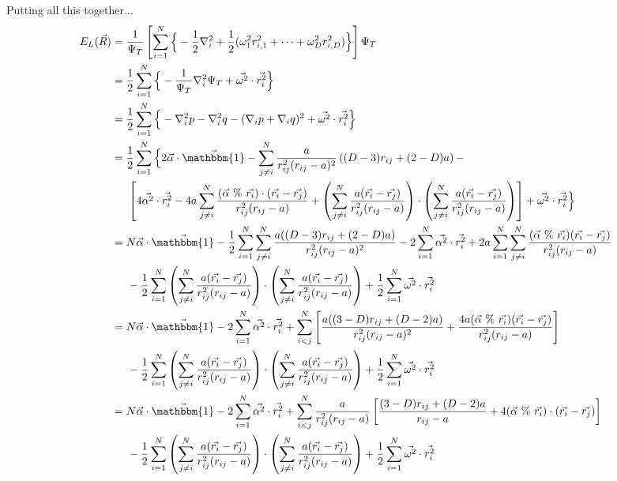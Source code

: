 \documentclass[12pt]{article}
\begin{document}
Putting all this together...
\begin{align*}
E_L(\vec{R}) &= \frac{1}{\Psi_T} 
\left[ \sum_{i=1}^N \Big\{ -\frac{1}{2}\nabla_i^2 + \frac{1}{2}(\omega_1^2r_{i,1}^2+\cdots+\omega_{D}^2r_{i,D}^2) \Big\} \right] \Psi_T \\
&= \frac{1}{2}  \sum_{i=1}^N \Big\{ -\frac{1}{\Psi_T} \nabla_i^2 \Psi_T + \vec{\omega^2} \cdot \vec{r_i^2}   \Big\}\\
&= \frac{1}{2} \sum_{i=1}^N \Big \{ - \nabla_i^2 p - \nabla_i^2 q - (\nabla_i p + \nabla_i q)^2 + \vec{\omega^2} \cdot \vec{r_i^2}   \Big\}\\
&= \frac{1}{2} \sum_{i=1}^N \Big \{ 2\vec{\alpha}\cdot \vec{\mathbbm{1}} - \sum_{j\neq i}^N \frac{a}{r_{ij}^2(r_{ij}-a)^2} \left( (D-3)r_{ij}+(2-D)a   \right) - \\
& \hspace*{5mm} \left[ 4 \vec{\alpha^2}\cdot\vec{r_i^2} - 4a \sum_{j\neq i}^N \frac{(\vec{\alpha} \ \% \ \vec{r_i}) \cdot (\vec{r_i}-\vec{r_j})}{r_{ij}^2(r_{ij}-a)} + \left( \sum_{j\neq i}^N \frac{a(\vec{r_i}-\vec{r_j})}{r_{ij}^2(r_{ij}-a)} \right) \cdot \left( \sum_{j\neq i}^N \frac{a(\vec{r_i}-\vec{r_j})}{r_{ij}^2(r_{ij}-a)} \right) \right] + \vec{\omega^2} \cdot \vec{r_i^2}   \Big\}\\
& = N\vec{\alpha}\cdot\vec{\mathbbm{1}} - \frac{1}{2}\sum_{i=1}^N \sum_{j\neq i}^N \frac{a((D-3)r_{ij}+(2-D)a)}{r_{ij}^2(r_{ij}-a)^2} - 2\sum_{i=1}^N \vec{\alpha^2}\cdot \vec{r_i^2} + 2a \sum_{i=1}^N \sum_{j \neq i}^N \frac{(\vec{\alpha} \ \% \ \vec{r_i})(\vec{r_i}-\vec{r_j})}{r_{ij}^2(r_{ij}-a)}\\
& \hspace*{5mm} -\frac{1}{2} \sum_{i=1}^N \left( \sum_{j\neq i}^N \frac{a(\vec{r_i}-\vec{r_j})}{r_{ij}^2(r_{ij}-a)} \right) \cdot \left( \sum_{j\neq i}^N \frac{a(\vec{r_i}-\vec{r_j})}{r_{ij}^2(r_{ij}-a)} \right) + \frac{1}{2}\sum_{i=1}^N \vec{\omega^2}\cdot \vec{r_i^2}\\
& = N\vec{\alpha}\cdot\vec{\mathbbm{1}} - 2\sum_{i=1}^N \vec{\alpha^2}\cdot \vec{r_i^2} 
+ \sum_{i<j}^N \left[ \frac{a((3-D)r_{ij}+(D-2)a)}{r_{ij}^2(r_{ij}-a)^2} + \frac{4a(\vec{\alpha} \ \% \ \vec{r_i})(\vec{r_i}-\vec{r_j})}{r_{ij}^2(r_{ij}-a)} \right]\\
& \hspace*{5mm} -\frac{1}{2} \sum_{i=1}^N \left( \sum_{j\neq i}^N \frac{a(\vec{r_i}-\vec{r_j})}{r_{ij}^2(r_{ij}-a)} \right) \cdot \left( \sum_{j\neq i}^N \frac{a(\vec{r_i}-\vec{r_j})}{r_{ij}^2(r_{ij}-a)} \right) + \frac{1}{2}\sum_{i=1}^N \vec{\omega^2}\cdot \vec{r_i^2}\\
& = N\vec{\alpha}\cdot\vec{\mathbbm{1}} - 2\sum_{i=1}^N \vec{\alpha^2}\cdot \vec{r_i^2} 
+ \sum_{i<j}^N \frac{a}{r_{ij}^2(r_{ij}-a)} \left[ 
\frac{(3-D)r_{ij}+(D-2)a}{r_{ij}-a} + 4(\vec{\alpha} \ \% \ \vec{r_i})\cdot (\vec{r_i}-\vec{r_j})
\right]\\
& \hspace*{5mm} -\frac{1}{2} \sum_{i=1}^N \left( \sum_{j\neq i}^N \frac{a(\vec{r_i}-\vec{r_j})}{r_{ij}^2(r_{ij}-a)} \right) \cdot \left( \sum_{j\neq i}^N \frac{a(\vec{r_i}-\vec{r_j})}{r_{ij}^2(r_{ij}-a)} \right) + \frac{1}{2}\sum_{i=1}^N \vec{\omega^2}\cdot \vec{r_i^2}\\
\end{align*}
\end{document}
